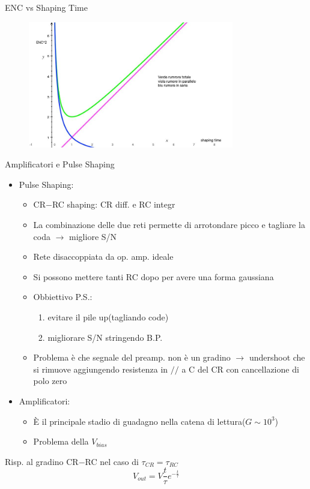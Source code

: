 \documentclass{beamer}
\begin{document}
\begin{frame}{ENC vs Shaping Time}
    \begin{figure}
    \centering
    \includegraphics[width=0.8\textwidth]{images/grafico_rumore.jpg}
\end{figure}
\end{frame}

\begin{frame}{Amplificatori e Pulse Shaping}
\begin{itemize}
    \item Pulse Shaping:
    \begin{itemize}
        \item CR$-$RC shaping: CR diff. e RC integr
        \item La combinazione delle due reti permette di arrotondare picco e tagliare la coda $\to$ migliore S/N
        \item Rete disaccoppiata da op. amp. ideale
        \item Si possono mettere tanti RC dopo per avere una forma gaussiana
        \item Obbiettivo P.S.:  \begin{enumerate}
            \item evitare il pile up(tagliando code)
            \item migliorare S/N stringendo B.P.
        \end{enumerate}
        \item Problema è che segnale del preamp. non è un gradino $\to$ undershoot che si rimuove aggiungendo resistenza in $//$ a C del CR con cancellazione di polo zero
    
    \end{itemize}
    \item Amplificatori:
    \begin{itemize}
        \item È il principale stadio di guadagno nella catena di lettura($G \sim 10^3$)
        \item Problema della $V_{bias}$
    \end{itemize}
\end{itemize}
Risp. al gradino CR$-$RC nel caso di $\tau_{CR}=\tau_{RC}$
    \begin{equation}
        V_{out} = V \frac{t}{\tau} e^{-\frac{t}{\tau}}
    \end{equation}
    
\end{frame}
\end{document}
